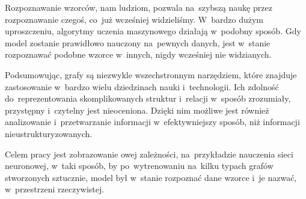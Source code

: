 Rozpoznawanie wzorców, nam ludziom, pozwala na~szybszą naukę przez rozpoznawanie czegoś, co~już wcześniej widzieliśmy.
W~bardzo dużym uproszczeniu, algorytmy uczenia maszynowego działają w~podobny sposób.
Gdy model zostanie prawidłowo nauczony na~pewnych danych,
jest w~stanie rozpoznawać podobne wzorce w~innych, nigdy wcześniej nie widzianych.

Podsumowując, grafy są niezwykle wszechstronnym narzędziem,
które znajduje zastosowanie w~bardzo wielu dziedzinach nauki i~technologii.
Ich zdolność do~reprezentowania skomplikowanych struktur i~relacji w~sposób zrozumiały, przystępny i~czytelny jest nieoceniona.
Dzięki nim możliwe jest również analizowanie i~przetwarzanie informacji w~efektywniejszy sposób,
niż informacji nieustrukturyzowanych. 

Celem pracy jest zobrazowanie owej zależności, na~przykładzie nauczenia sieci neuronowej,
w~taki sposób, by po~wytrenowaniu na~kilku typach grafów stworzonych sztucznie,
model był w~stanie rozpoznać dane wzorce i~je nazwać, w~przestrzeni rzeczywistej.